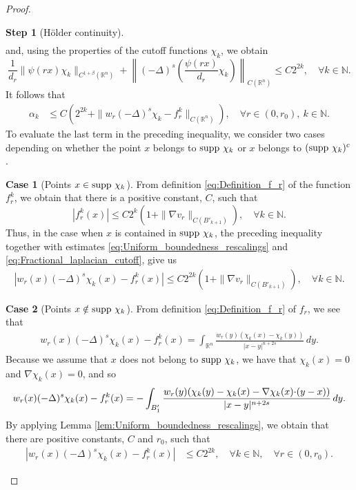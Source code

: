 \documentclass[11pt,reqno]{amsart}
\theoremstyle{definition}
\newtheorem{case}{Case}
\newtheorem{step}{Step}
\theoremstyle{remark}
\begin{document}
\begin{proof}
\begin{step}[H\"older continuity]
\begin{align*}
\end{align*}
and, using the properties of the cutoff functions $\chi_k$, we obtain
$$
 \frac{1}{d_r}\|\psi(rx)\chi_k\|_{C^{1+\beta}({\mathbb{R}}^n)}+\left\|(-\Delta)^s\left(\frac{\psi(rx)}{d_r}\chi_k\right)\right\|_{C({\mathbb{R}}^n)} \leq C2^{2k},\quad\forall k \in {\mathbb{N}}.
$$
It follows that 
\begin{align}
\label{eq:Estimate_alpha_k_1}
\alpha_k &\leq C\left(2^{2k} + \|w_r(-\Delta)^s\chi_k -f^k_r\|_{C({\mathbb{R}}^n)} \right),\quad\forall r\in (0,r_0),\ k\in{\mathbb{N}}.
\end{align}
To evaluate the last term in the preceding inequality, we consider two cases depending on whether the point $x$ belongs to $\hbox{supp }\chi_k$ or $x$ belongs to $(\hbox{supp }\chi_k)^c$.

\begin{case}[Points $x\in \hbox{supp }\chi_k$]
\label{case:Estimate_alpha_k_x_less_1}
From definition \eqref{eq:Definition_f_r} of the function $f^k_r$, we obtain that there is a positive constant, $C$, such that
$$
|f^k_r(x)| \leq C 2^{k}\left(1+\|\nabla v_r\|_{C(B'_{k+1})}\right),\quad\forall k \in {\mathbb{N}}.
$$
Thus, in the case when $x$ is contained in $\hbox{supp }\chi_k$, the preceding inequality together with estimates \eqref{eq:Uniform_boundedness_rescalings} and  \eqref{eq:Fractional_laplacian_cutoff}, give us
\begin{align*}
|w_r(x)(-\Delta)^s\chi_k(x) -f^k_r(x)|\leq C 2^{2k}(1+\|\nabla v_r\|_{C(B'_{k+1})}),\quad\forall k \in {\mathbb{N}}.
\end{align*}
\end{case}

\begin{case}[Points $x\notin \hbox{supp }\chi_k$]
\label{case:Estimate_alpha_k_x_greater_1}
From definition \eqref{eq:Definition_f_r} of $f_r$, we see that
\begin{align*}
w_r(x)(-\Delta)^s\chi_k(x) -f^k_r(x) = \int_{{\mathbb{R}}^n}\frac{w_r(y)(\chi_k(x)-\chi_k(y))}{|x-y|^{n+2s}}\, dy.
\end{align*}
Because we assume that $x$ does not belong to $\hbox{supp }\chi_k$, we have that $\chi_k(x)=0$ and $\nabla\chi_k(x)=0$, and so
\begin{align*}
w_r(x)(-\Delta)^s\chi_k(x) -f^k_r(x) = -\int_{B'_1}\frac{w_r(y)(\chi_k(y)-\chi_k(x)-\nabla\chi_k(x){\hbox{$\cdot$}}(y-x))}{|x-y|^{n+2s}}\, dy.
\end{align*}
By applying Lemma \ref{lem:Uniform_boundedness_rescalings}, we obtain that there are positive constants, $C$ and $r_0$, such that
\begin{align*}
|w_r(x)(-\Delta)^s\chi_k(x) -f^k_r(x)| &\leq C2^{2k},\quad\forall k \in {\mathbb{N}},\quad\forall r\in (0,r_0).
\end{align*}
\end{case}


\end{step}
\end{proof}
\end{document}
